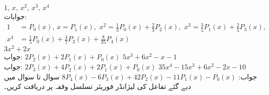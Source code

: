 \quad
$1,\,  x,\, x^2,\, x^3,\, x^4$\\
جوابات:
\begin{align*}
1&=P_0(x),\, x=P_1(x),\,\, x^2=\tfrac{1}{3}P_0(x)+\tfrac{2}{3}P_2(x),\,\, x^3=\tfrac{3}{5}P_1(x)+\tfrac{2}{5}P_3(x),\\
 x^4&=\tfrac{1}{5}P_0(x)+\tfrac{4}{7}P_2(x)+\tfrac{8}{35}P_4(x)
\end{align*}
\quad
$3x^2+2x$\\
جواب:
$2P_2(x)+2P_1(x)+P_0(x)$
\quad
$5x^3+6x^2-x-1$\\
جواب:
$2P_3(x)+4P_2(x)+2P_1(x)+P_0(x)$
\quad
$35x^4-15x^3+6x^2-2x-10$\\
جواب:
$8P_4(x)-6P_3(x)+42P_2(x)-11P_1(x)-P_0(x)$
سوال  تا سوال  میں  دیے گئے تفاعل کی لیژانڈر فوریئر  تسلسل وقفہ   پر دریافت کریں۔

